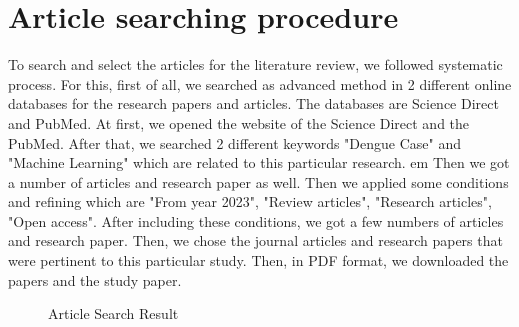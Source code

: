 \documentclass{article}
\begin{document}
\section{Article searching procedure}
To search and select the articles for the literature review, we followed systematic process. For this, first of all, we searched as advanced method in 2 different online databases for
the research papers and articles. The databases are Science Direct and PubMed. At first, we opened the website of the Science Direct and the PubMed. After that, we searched 2 different
keywords "Dengue Case" and "Machine Learning" which are related to this particular research.
    { em}
Then we got a number of articles and research paper as well. Then we applied some conditions
and refining which are "From year 2023", "Review articles", "Research articles", "Open access". After including these conditions, we got a few numbers of articles and research paper.
Then, we chose the journal articles and research papers that were pertinent to this particular study. Then, in PDF format, we downloaded the papers and the study paper.
% 
% 
\begin{figure}[htbp]
    \begin{center}
        \caption{Article Search Result}
    \end{center}
\end{figure}
% 
%
\newpage
\end{document}
